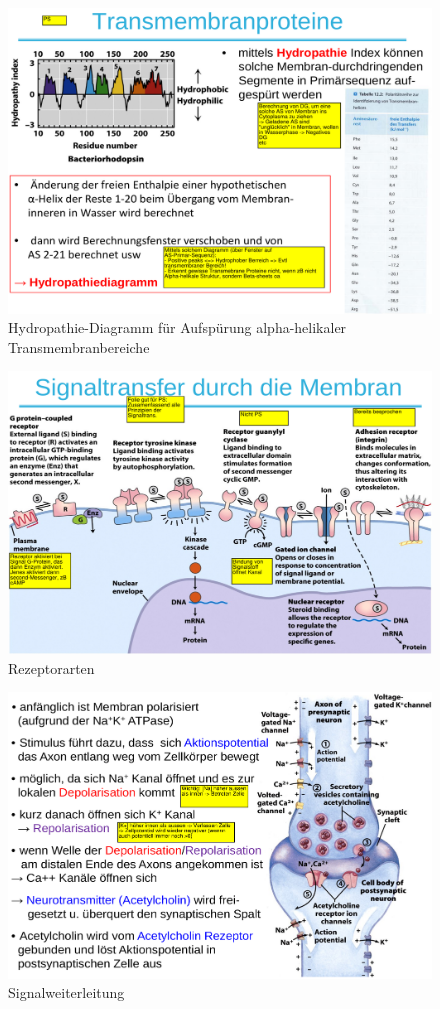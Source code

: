 \documentclass[a4paper,twocolumn,usegeometry,english,fontsize=6,DIV=16]{scrartcl}
\begin{document}
\begin{figure}
	\centering
	\includegraphics[width=0.8\linewidth]{img/hydropathie.png}
	\caption{Hydropathie-Diagramm für Aufspürung alpha-helikaler Transmembranbereiche}
\end{figure}

\begin{figure}
	\centering
	\includegraphics[width=\linewidth]{img/signaltransfer.png}
	\caption{Rezeptorarten}
\end{figure}

\begin{figure}
	\centering
	\includegraphics[width=0.8\linewidth]{img/signalweiterleitung.png}
	\caption{Signalweiterleitung}
\end{figure}
\end{document}
